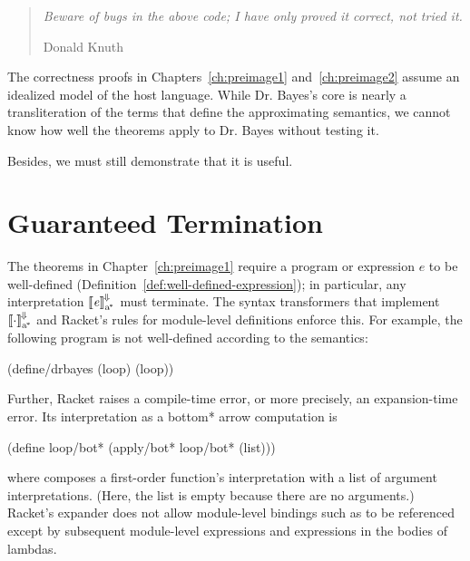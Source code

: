
\begin{quote}
\textit{Beware of bugs in the above code; I have only proved it correct, not tried it.}

\hfill Donald Knuth
\end{quote}

The correctness proofs in Chapters~\ref{ch:preimage1} and~\ref{ch:preimage2} assume an idealized model of the host language.
While Dr. Bayes's core is nearly a transliteration of the \lzfclang terms that define the approximating semantics, we cannot know how well the theorems apply to Dr. Bayes without testing it.

Besides, we must still demonstrate that it is useful.

\section{Guaranteed Termination}

The theorems in Chapter~\ref{ch:preimage1} require a program or expression $\mathit{e}$ to be well-defined (Definition~\ref{def:well-defined-expression}); in particular, any interpretation $\left\llbracket{\mathit{e}}\right\rrbracket^{\mspace{-2mu}\Downarrow\mspace{-2mu}}_\mathrm{a^{\mspace{-2mu}*}}$ must terminate.
The syntax transformers that implement $\left\llbracket{\cdot}\right\rrbracket^{\mspace{-2mu}\Downarrow\mspace{-2mu}}_\mathrm{a^{\mspace{-2mu}*}}$ and Racket's rules for module-level definitions enforce this.
For example, the following program is not well-defined according to the semantics:
\begin{center}\singlespacing
\begin{schemedisplay}
(define/drbayes (loop) (loop))
\end{schemedisplay}
\end{center}
Further, Racket raises a compile-time error, or more precisely, an expansion-time error.
Its interpretation as a bottom* arrow computation is
\begin{center}\singlespacing
\begin{schemedisplay}
(define loop/bot* (apply/bot* loop/bot* (list)))
\end{schemedisplay}
\end{center}
where  composes a first-order function's interpretation with a list of argument interpretations.
(Here, the list is empty because there are no arguments.)
Racket's expander does not allow module-level bindings such as  to be referenced except by subsequent module-level expressions and expressions in the bodies of lambdas.

